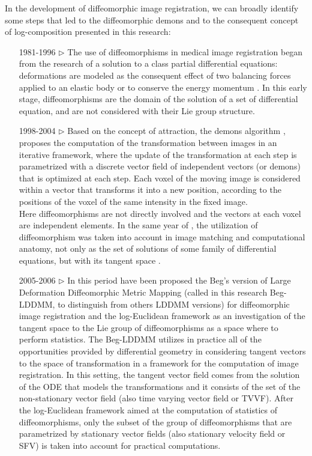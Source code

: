 In the development of diffeomorphic image registration, we can broadly identify some steps that led to the diffeomorphic demons and to the consequent concept of log-composition presented in this research:
\begin{enumerate}
	\item[1981-1996 $\triangleright$] The use of diffeomorphisms in medical image registration began from the research of a solution to a class partial differential equations: deformations are modeled as the consequent effect of two balancing forces applied to an elastic body \cite{Broit:1981} or to conserve the energy momentum \cite{christensen1996deformable}. In this early stage, diffeomorphisms are the domain of the solution of a set of differential equation, and are not considered with their Lie group structure.
	\item[1998-2004 $\triangleright$] Based on the concept of attraction, the demons algorithm \cite{thirion1998image}, \cite{pennec1999understanding} proposes the computation of the transformation between images in an iterative framework, where the update of the transformation at each step is parametrized with a discrete vector field of independent vectors (or demons) that is optimized at each step. Each voxel of the moving image is considered within a vector that transforms it into a new position, according to the positions of the voxel of the same intensity in the fixed image. \\
	Here diffeomorphisms are not directly involved and the vectors at each voxel are independent elements. 
	In the same year of \cite{thirion1998image}, the utilization of diffeomorphism was taken into account in image matching and computational anatomy, not only as the set of solutions of some family of differential equations, but with its tangent space \cite{Dupuis:98:variationalproblems,  trouve1998diffeomorphisms, grenander1998computational}.
	\item[2005-2006 $\triangleright$] In this period have been proposed the Beg's version of Large Deformation Diffeomorphic Metric Mapping (called in this research Beg-LDDMM, to distinguish from others LDDMM versions) \cite{beg2005computing} for diffeomorphic image registration and the log-Euclidean framework \cite{arsigny2006statistics, Arsigny:MRM:06}  as an investigation of the tangent space to the Lie group of diffeomorphisms as a space where to perform statistics.
	The Beg-LDDMM utilizes in practice all of the opportunities provided by differential geometry in considering tangent vectors to the space of transformation in a framework for the computation of image registration. In this setting, the tangent vector field comes from the solution of the ODE that models the transformations and it consists of the set of the non-stationary vector field (also time varying vector field or TVVF). After the log-Euclidean framework aimed at the computation of statistics of diffeomorphisms, only the subset of the group of diffeomorphisms that are parametrized by stationary vector fields (also stationary velocity field or SFV) is taken into account for practical computations.

\end{enumerate}

